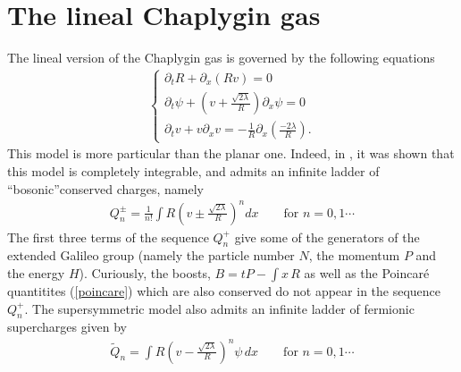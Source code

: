 \documentclass[11pt,a4paper]{article}
\let\ssection=\section
\renewcommand{\section}{\setcounter{equation}{0}\ssection}
\begin{document}
\section{The lineal Chaplygin gas}
The lineal version of the Chaplygin gas is governed by the following equations
\begin{eqnarray}
\left\{
\begin{array}{c}
\partial_t R+\partial_x(R v)=0\\
[3mm]
\displaystyle{\partial_t\psi+\left(v+\frac{\sqrt{2\lambda}}{R}\right)\partial_x\psi=0}\\
\displaystyle{\partial_t v+v\partial_x v=-\frac{1}{R}\partial_x\left(\frac{-2\lambda}{R}\right)}.
\end{array}
\right.
\label{eulernonre}
\end{eqnarray}
This model is more particular than the planar one. Indeed, in \cite{BJ}, it was shown that this model is completely integrable, and admits an infinite ladder of ``bosonic''conserved charges, namely
\begin{eqnarray}
\displaystyle{Q_n^{\pm}=\frac{1}{n!}\int R\left(v\pm\frac{\sqrt{2\lambda}}{R}\right)^n dx}\qquad\mbox{for}\,\,n=0, 1\cdots
\label{infinitebosonic}
\end{eqnarray}
The first three terms of the sequence $Q_n^+$ give some of the generators of the extended Galileo group (namely the particle number $N$, the momentum $P$ and the energy $H$). Curiously, the boosts, $B=t P-\int x\,R$ as well as the Poincar\'e quantitites (\ref{poincare}) which are also conserved do not appear in the sequence $Q_n^+$. The supersymmetric model also admits an infinite ladder of fermionic supercharges \cite{BJ} given by
\begin{eqnarray}
\displaystyle{\tilde{Q}_n=\int R\left(v-\frac{\sqrt{2\lambda}}{R}\right)^n\psi\, dx}\qquad \mbox{for}\,\,n=0, 1\cdots
\label{infinitefermionic}
\end{eqnarray}
\end{document}
